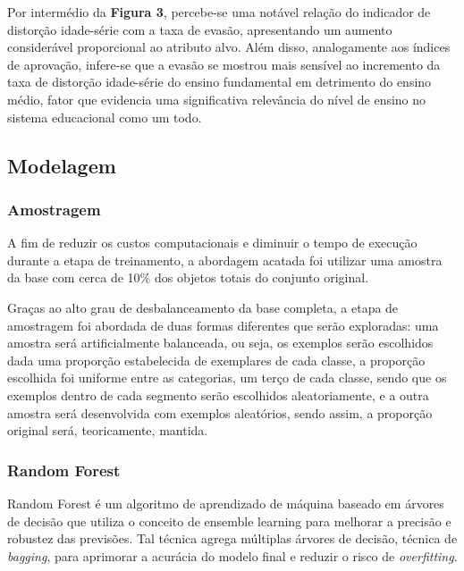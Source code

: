 \par Por intermédio da \textbf{Figura 3}, percebe-se uma notável relação do indicador de distorção idade-série com a taxa de evasão, apresentando um aumento considerável proporcional ao atributo alvo. Além disso, analogamente aos índices de aprovação, infere-se que a evasão se mostrou mais sensível ao incremento da taxa de distorção idade-série do ensino fundamental em detrimento do ensino médio, fator que evidencia uma significativa relevância do nível de ensino no sistema educacional como um todo.

\subsection{Modelagem}

\subsubsection{Amostragem}

\par A fim de reduzir os custos computacionais e diminuir o tempo de execução durante a etapa de treinamento, a abordagem acatada foi utilizar uma amostra da base com cerca de 10\% dos objetos totais do conjunto original.

\par Graças ao alto grau de desbalanceamento da base completa, a etapa de amostragem foi abordada de duas formas diferentes que serão exploradas: uma amostra será artificialmente balanceada, ou seja, os exemplos serão escolhidos dada uma proporção estabelecida de exemplares de cada classe, a proporção escolhida foi uniforme entre as categorias, um terço de cada classe, sendo que os exemplos dentro de cada segmento serão escolhidos aleatoriamente, e a outra amostra será desenvolvida com exemplos aleatórios, sendo assim, a proporção original será, teoricamente, mantida.

\subsubsection{Random Forest}

\par Random Forest é um algoritmo de aprendizado de máquina baseado em árvores de decisão que utiliza o conceito de ensemble learning para melhorar a precisão e robustez das previsões. Tal técnica agrega múltiplas árvores de decisão, técnica de \textit{bagging}, para aprimorar a acurácia do modelo final e reduzir o risco de \textit{overfitting}.

